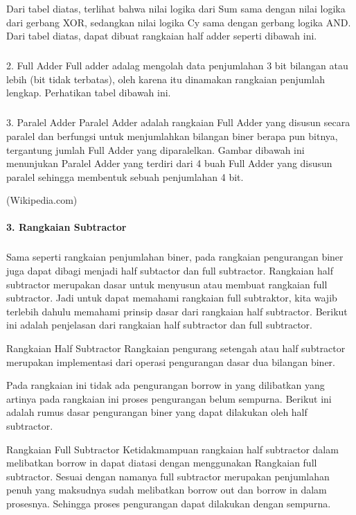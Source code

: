 \documentclass[12pt,a4paper]{article}
\begin{document}
Dari tabel diatas, terlihat bahwa nilai logika dari Sum sama dengan nilai logika dari gerbang XOR, sedangkan nilai logika Cy sama dengan gerbang logika  AND. Dari tabel diatas, dapat dibuat rangkaian half adder seperti dibawah ini.

\subparagraph{ }
2. Full Adder
Full adder adalag mengolah data penjumlahan 3 bit bilangan atau lebih (bit tidak terbatas), oleh karena itu dinamakan rangkaian penjumlah lengkap. Perhatikan tabel dibawah ini.

\subparagraph{ }
3. Paralel Adder
Paralel Adder adalah rangkaian Full Adder yang disusun secara paralel dan berfungsi untuk menjumlahkan bilangan biner berapa pun bitnya, tergantung jumlah Full Adder yang diparalelkan. Gambar dibawah ini menunjukan Paralel Adder yang terdiri dari 4 buah Full Adder yang disusun paralel sehingga membentuk sebuah penjumlahan 4 bit.

\begin{flushright}
(Wikipedia.com) 
\end{flushright}

\paragraph{ }
\textbf{3. Rangkaian Subtractor}
\subparagraph{ }
	Sama seperti rangkaian penjumlahan biner, pada rangkaian pengurangan biner juga dapat dibagi menjadi half subtactor dan full subtractor. Rangkaian half subtractor merupakan dasar untuk menyusun atau membuat rangkaian full subtractor. Jadi untuk dapat memahami rangkaian full subtraktor, kita wajib terlebih dahulu memahami prinsip dasar dari rangkaian half subtractor. Berikut ini adalah penjelasan dari rangkaian half subtractor dan full subtractor.

Rangkaian Half Subtractor
Rangkaian pengurang setengah atau half subtractor merupakan implementasi dari operasi pengurangan dasar dua bilangan biner. 

Pada rangkaian ini tidak ada pengurangan borrow in yang dilibatkan yang artinya pada rangkaian ini proses pengurangan belum sempurna. Berikut ini adalah rumus dasar pengurangan biner yang dapat dilakukan oleh half subtractor.

Rangkaian Full Subtractor
Ketidakmampuan rangkaian half subtractor dalam melibatkan borrow in dapat diatasi dengan menggunakan Rangkaian full subtractor. Sesuai dengan namanya full subtractor merupakan penjumlahan penuh yang maksudnya sudah melibatkan borrow out dan borrow in dalam prosesnya. Sehingga proses pengurangan dapat dilakukan dengan sempurna. 
\end{document}
